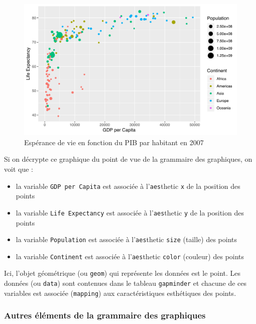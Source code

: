 \documentclass[a4paperpaper,]{article}
\providecommand{\tightlist}{%
  \setlength{\itemsep}{0pt}\setlength{\parskip}{0pt}}
\theoremstyle{definition}
\theoremstyle{definition}
\theoremstyle{definition}
\theoremstyle{remark}
\begin{document}
\begin{figure}[htpb]

{\centering \includegraphics[width=0.9\linewidth]{figure/gapmind-1} 

}

\caption{Espérance de vie en fonction du PIB par habitant en 2007}\label{fig:gapmind}
\end{figure}

Si on décrypte ce graphique du point de vue de la grammaire des
graphiques, on voit que :

\begin{itemize}
\tightlist
\item
  la variable \texttt{GDP\ per\ Capita} est associée à
  l'\texttt{aes}thetic \texttt{x} de la position des points
\item
  la variable \texttt{Life\ Expectancy} est associée à
  l'\texttt{aes}thetic \texttt{y} de la position des points
\item
  la variable \texttt{Population} est associée à l'\texttt{aes}thetic
  \texttt{size} (taille) des points
\item
  la variable \texttt{Continent} est associée à l'\texttt{aes}thetic
  \texttt{color} (couleur) des points
\end{itemize}

Ici, l'objet géométrique (ou \texttt{geom}) qui représente les données
est le point. Les données (ou \texttt{data}) sont contenues dans le
tableau \texttt{gapminder} et chacune de ces variables est associée
(\texttt{mapping}) aux caractéristiques esthétiques des points.

\subsubsection{Autres éléments de la grammaire des
graphiques}\label{autres-elements-de-la-grammaire-des-graphiques}
\end{document}
